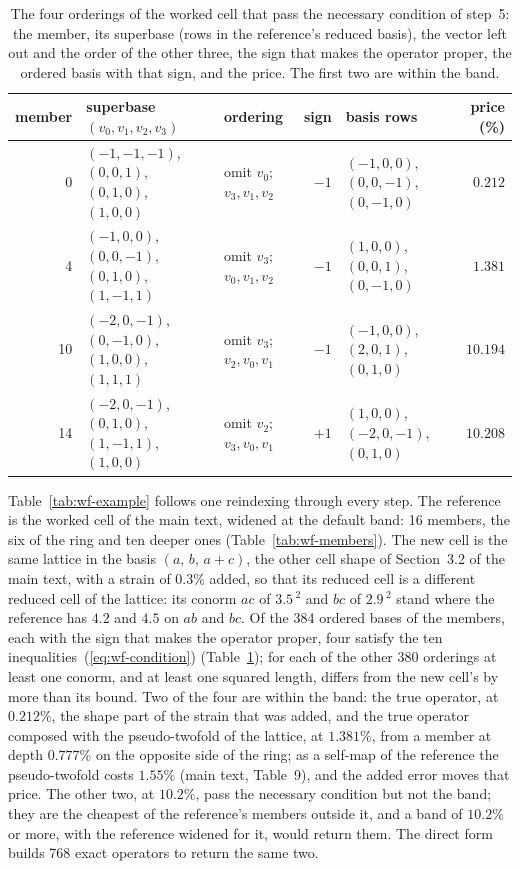\documentclass[preprint,pdf]{iucr}          %
\newcommand{\Ang}{\text{\AA}}
\begin{document}
\begin{table}
\caption{The four orderings of the worked cell that pass the necessary condition of step~5: the member, its superbase (rows in the reference's reduced basis), the vector left out and the order of the other three, the sign that makes the operator proper, the ordered basis with that sign, and the price. The first two are within the band.}
\label{tab:wf-priced}
\begin{footnotesize}
\begin{tabular}{r>{\raggedright\arraybackslash}p{4.3cm}lr>{\raggedright\arraybackslash}p{3.6cm}r}
\toprule
member & superbase $(v_0,v_1,v_2,v_3)$ & ordering & sign & basis rows & price (\%) \\
\midrule
0 & $(-1,-1,-1)$, $(0,0,1)$, $(0,1,0)$, $(1,0,0)$ & omit $v_0$; $v_3,v_1,v_2$ & $-1$ & $(-1,0,0)$, $(0,0,-1)$, $(0,-1,0)$ & $0.212$ \\
4 & $(-1,0,0)$, $(0,0,-1)$, $(0,1,0)$, $(1,-1,1)$ & omit $v_3$; $v_0,v_1,v_2$ & $-1$ & $(1,0,0)$, $(0,0,1)$, $(0,-1,0)$ & $1.381$ \\
10 & $(-2,0,-1)$, $(0,-1,0)$, $(1,0,0)$, $(1,1,1)$ & omit $v_3$; $v_2,v_0,v_1$ & $-1$ & $(-1,0,0)$, $(2,0,1)$, $(0,1,0)$ & $10.194$ \\
14 & $(-2,0,-1)$, $(0,1,0)$, $(1,-1,1)$, $(1,0,0)$ & omit $v_2$; $v_3,v_0,v_1$ & $+1$ & $(1,0,0)$, $(-2,0,-1)$, $(0,1,0)$ & $10.208$ \\
\bottomrule
\end{tabular}
\end{footnotesize}
\end{table}

Table~\ref{tab:wf-example} follows one reindexing through every step. The reference is the worked cell of the main text, widened at the default band: 16 members, the six of the ring and ten deeper ones (Table~\ref{tab:wf-members}). The new cell is the same lattice in the basis $(a,\,b,\,a+c)$, the other cell shape of Section~3.2 of the main text, with a strain of $0.3\%$ added, so that its reduced cell is a different reduced cell of the lattice: its conorm $ac$ of $3.5$\,\Ang$^2$ and $bc$ of $2.9$\,\Ang$^2$ stand where the reference has $4.2$ and $4.5$ on $ab$ and $bc$. Of the 384 ordered bases of the members, each with the sign that makes the operator proper, four satisfy the ten inequalities~(\ref{eq:wf-condition}) (Table~\ref{tab:wf-priced}); for each of the other 380 orderings at least one conorm, and at least one squared length, differs from the new cell's by more than its bound. Two of the four are within the band: the true operator, at $0.212\%$, the shape part of the strain that was added, and the true operator composed with the pseudo-twofold of the lattice, at $1.381\%$, from a member at depth $0.777\%$ on the opposite side of the ring; as a self-map of the reference the pseudo-twofold costs $1.55\%$ (main text, Table~9), and the added error moves that price. The other two, at $10.2\%$, pass the necessary condition but not the band; they are the cheapest of the reference's members outside it, and a band of $10.2\%$ or more, with the reference widened for it, would return them. The direct form builds 768 exact operators to return the same two.
\end{document}
